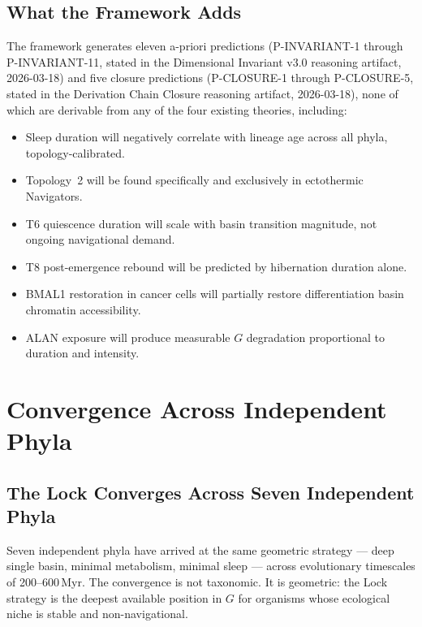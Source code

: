 \documentclass[10pt, a4paper]{article}
\begin{document}
\subsection{What the Framework Adds}

The framework generates eleven a-priori
predictions (P-INVARIANT-1 through
P-INVARIANT-11, stated in the Dimensional
Invariant v3.0 reasoning artifact,
2026-03-18) and five closure predictions
(P-CLOSURE-1 through P-CLOSURE-5,
stated in the Derivation Chain Closure
reasoning artifact, 2026-03-18), none
of which are derivable from any of the
four existing theories, including:

\begin{itemize}[itemsep=0.2em]
  \item Sleep duration will negatively
    correlate with lineage age across
    all phyla, topology-calibrated.

  \item Topology~2 will be found
    specifically and exclusively in
    ectothermic Navigators.

  \item T6 quiescence duration will
    scale with basin transition
    magnitude, not ongoing navigational
    demand.

  \item T8 post-emergence rebound will
    be predicted by hibernation duration
    alone.

  \item BMAL1 restoration in cancer
    cells will partially restore
    differentiation basin chromatin
    accessibility.

  \item ALAN exposure will produce
    measurable $G$ degradation
    proportional to duration and
    intensity.
\end{itemize}

\section{Convergence Across Independent
Phyla}
\label{sec:convergence}

\subsection{The Lock Converges Across
Seven Independent Phyla}

Seven independent phyla have arrived
at the same geometric strategy ---
deep single basin, minimal metabolism,
minimal sleep --- across evolutionary
timescales of 200--600\,Myr. The
convergence is not taxonomic. It is
geometric: the Lock strategy is the
deepest available position in $G$ for
organisms whose ecological niche is
stable and non-navigational.
\end{document}

